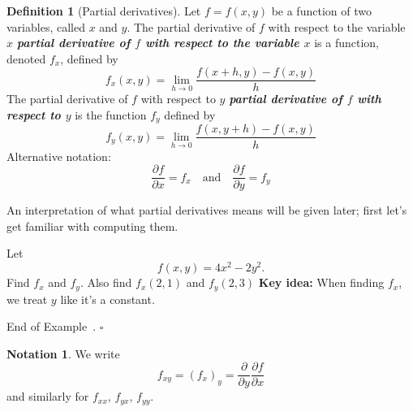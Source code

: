 \documentclass[10pt]{article}
\DeclareRobustCommand{\demph}[1]{%
  \ifmmode
  {\color{Blue}#1}%
  \else
  {\color{Blue}\bfseries\slshape #1}%
  \fi
}
\theoremstyle{definition}
\newtheorem{definition}[theorem]{Definition}
\newtheorem{example}[theorem]{Example}
\newtheorem{notation}[theorem]{Notation}
\renewenvironment{example}
{\begin{oldexample}}
  {\par\smallskip\hfill   End of Example~\theexample. $\square$    \par\end{oldexample}}
\newcommand{\1}[1]{\textbf{1}_{\left[#1\right]}} %
\def\R{\mathbb{R}} %
\begin{document}
\begin{definition}[Partial derivatives]
  Let $f=f(x,y)$ be a function of two variables, called $x$ and $y$.
  The \demph{partial derivative of $f$ with respect to the variable $x$} is a
  function, denoted $f_{x}$, defined by
  \begin{equation*}
    f_{x}(x,y) = \lim_{h \to 0} \frac{f(x+h,y)-f(x,y)}{h}
  \end{equation*}
  The \demph{partial derivative of $f$ with respect to $y$ } is the function
  $f_{y}$ defined by
  \begin{equation*}
    f_{y}(x,y)= \lim_{h \to 0} \frac{f(x,y+h)-f(x,y)}{h}
  \end{equation*}
  Alternative notation:
  \begin{equation*}
    \frac{\partial f}{\partial x} = f_{x}
    \quad \text{and} \quad
    \frac{\partial f}{\partial y} = f_{y}
  \end{equation*}
\end{definition}

An interpretation of what partial derivatives means will be given later; first
let's get familiar with computing them.

\begin{example}
  Let
  \begin{equation*}
    f(x,y) = 4x^{2}-2y^{2}.
  \end{equation*}
  Find $f_{x}$ and $f_{y}$. Also find $f_{x}(2,1)$ and $f_{y}(2,3)$
  \textbf{Key idea:} When finding $f_{x}$, we treat $y$ like it's a constant.
\end{example}

\begin{notation}
  We write
  \begin{equation*}
    f_{xy} = (f_{x})_{y} = \frac{\partial }{\partial y} \frac{\partial f}{\partial x}
  \end{equation*}
  and similarly for $f_{xx}$, $f_{yx}$, $f_{yy}$.
\end{notation}
\end{document}
